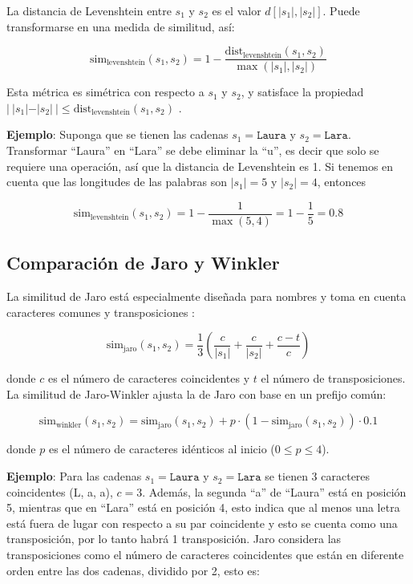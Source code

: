 \documentclass[
  12pt,
]{book}
\begin{document}
La distancia de Levenshtein entre \(s_1\) y \(s_2\) es el valor \(d[|s_1|, |s_2|]\). Puede transformarse en una medida de similitud, así:

\[\text{sim}_{\text{levenshtein}}(s_1, s_2) = 1 - \frac{\text{dist}_{\text{levenshtein}}(s_1, s_2)}{\max(|s_1|, |s_2|)}\]

Esta métrica es simétrica con respecto a \(s_1\) y \(s_2\), y satisface la propiedad \(|\ |s_1| - |s_2|\ | \le \text{dist}_{\text{levenshtein}}(s_1, s_2)\) \citep{christen2012data}.

\textbf{Ejemplo}: Suponga que se tienen las cadenas \(s_1 = \texttt{Laura}\) y \(s_2=\texttt{Lara}\). Transformar ``Laura'' en ``Lara'' se debe eliminar la ``u'', es decir que solo se requiere una operación, así que la distancia de Levenshtein es 1. Si tenemos en cuenta que las longitudes de las palabras son \(|s_1|=5\) y \(|s_2|=4\), entonces

\[\text{sim}_{\text{levenshtein}}(s_1, s_2) = 1 - \frac{1}{\max(5, 4)}=1-\frac{1}{5}=0.8\]

\subsection{Comparación de Jaro y Winkler}\label{comparaciuxf3n-de-jaro-y-winkler}

La similitud de Jaro está especialmente diseñada para nombres y toma en cuenta caracteres comunes y transposiciones \citep{christen2012data}:

\[\text{sim}_{\text{jaro}}(s_1, s_2) = \frac{1}{3} \left( \frac{c}{|s_1|} + \frac{c}{|s_2|} + \frac{c - t}{c} \right)\]

donde \(c\) es el número de caracteres coincidentes y \(t\) el número de transposiciones. La similitud de Jaro-Winkler ajusta la de Jaro con base en un prefijo común:

\[\text{sim}_{\text{winkler}}(s_1, s_2) = \text{sim}_{\text{jaro}}(s_1, s_2) + p \cdot (1 - \text{sim}_{\text{jaro}}(s_1, s_2)) \cdot 0.1\]

donde \(p\) es el número de caracteres idénticos al inicio (\(0\leq p \leq 4\)).

\textbf{Ejemplo}: Para las cadenas \(s_1 = \texttt{Laura}\) y \(s_2=\texttt{Lara}\) se tienen 3 caracteres coincidentes (L, a, a), \(c=3\). Además, la segunda ``a'' de ``Laura'' está en posición 5, mientras que en ``Lara'' está en posición 4, esto indica que al menos una letra está fuera de lugar con respecto a su par coincidente y esto se cuenta como una transposición, por lo tanto habrá 1 transposición. Jaro considera las transposiciones como el número de caracteres coincidentes que están en diferente orden entre las dos cadenas, dividido por 2, esto es:
\end{document}
